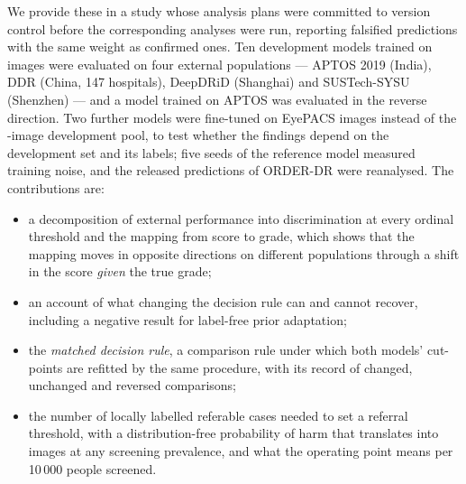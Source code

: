 We provide these in a study whose analysis plans were committed to version control before the
corresponding analyses were run, reporting falsified predictions with the same weight as
confirmed ones. Ten development models trained on  images were evaluated on four
external populations --- APTOS 2019 (India), DDR (China, 147 hospitals), DeepDRiD (Shanghai)
and SUSTech-SYSU (Shenzhen) --- and a model trained on APTOS was evaluated in the reverse
direction. Two further models were fine-tuned on  EyePACS images instead of the
-image development pool, to test whether the findings depend on the development set and
its labels; five seeds of the reference model measured training noise, and the released
predictions of ORDER-DR were reanalysed. The contributions are:
\begin{itemize}
\item a decomposition of external performance into discrimination at every ordinal threshold
and the mapping from score to grade, which shows that the mapping moves in opposite directions
on different populations through a shift in the score \emph{given} the true grade;
\item an account of what changing the decision rule can and cannot recover, including a negative
result for label-free prior adaptation;
\item the \emph{matched decision rule}, a comparison rule under which both models' cut-points are
refitted by the same procedure, with its record of changed, unchanged and reversed comparisons;
\item the number of locally labelled referable cases needed to set a referral threshold, with a
distribution-free probability of harm that translates into images at any screening prevalence, and
what the operating point means per 10\,000 people screened.
\end{itemize}
